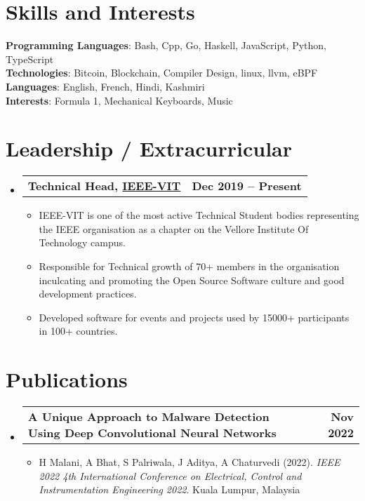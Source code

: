 \documentclass[a4paper,11pt]{article}
\makeatletter
\newcommand{\resumeItem}[1]{
  \item\small{
    {#1 \vspace{-2pt}}
  }
}
\newcommand{\resumeSubheadingg}[2]{
  \vspace{-2pt}\item
    \begin{tabular*}{1.0\textwidth}[t]{l@{\extracolsep{\fill}}r}
      \textbf{#1} & \textbf{\small #2} \\
    \end{tabular*}\vspace{-7pt}
}
\newcommand{\resumeSubHeadingListStart}{\begin{itemize}[leftmargin=0.0in, label={}]}
\newcommand{\resumeSubHeadingListEnd}{\end{itemize}}
\newcommand{\resumeItemListStart}{\begin{itemize}}
\newcommand{\resumeItemListEnd}{\end{itemize}\vspace{-5pt}}
\makeatother
\begin{document}
%
\section{Skills and Interests}
 \begin{itemize}[leftmargin=0.15in, label={}]
    \small{\item{
     \textbf{Programming Languages}{: Bash, Cpp, Go, Haskell, JavaScript, Python, TypeScript} \\
     \textbf{Technologies}{:  Bitcoin, Blockchain, Compiler Design, linux, llvm, eBPF} \\
     \textbf{Languages}{: English, French, Hindi, Kashmiri} \\
     \textbf{Interests}{: Formula 1, Mechanical Keyboards, Music} \\
    }}
 \end{itemize}
 \vspace{-16pt}

\section{Leadership / Extracurricular}
    \resumeSubHeadingListStart
        \resumeSubheadingg{{Technical Head, \href{https://ieeevit.org}{IEEE-VIT}}}{Dec 2019 -- Present}
            \resumeItemListStart
                \resumeItem{IEEE-VIT is one of the most active Technical Student bodies representing the IEEE organisation as a chapter on the Vellore Institute Of Technology campus.}
                \resumeItem{Responsible for Technical growth of 70+ members in the organisation inculcating and promoting the Open Source Software culture and good development practices.}
                \resumeItem{Developed software for events and projects used by 15000+ participants in 100+ countries.}
            \resumeItemListEnd
    \resumeSubHeadingListEnd
    
\section{Publications}
  \resumeSubHeadingListStart
    \resumeSubheadingg
      {A Unique Approach to Malware Detection Using Deep Convolutional Neural Networks}{Nov 2022}
      \resumeItemListStart
        \resumeItem{H Malani, A Bhat, S Palriwala, J Aditya, A Chaturvedi (2022). \textit{IEEE 2022 4th International Conference on Electrical, Control and Instrumentation Engineering 2022}. Kuala Lumpur, Malaysia}
    \resumeItemListEnd
  \resumeSubHeadingListEnd
\end{document}
